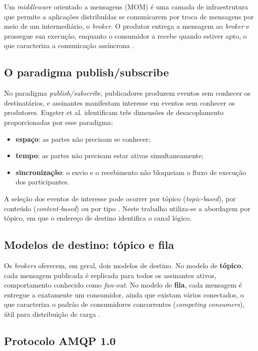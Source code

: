 \documentclass[12pt,a4paper]{article}
\begin{document}
Um \textit{middleware} orientado a mensagens (MOM) é uma camada de infraestrutura que permite a aplicações distribuídas se comunicarem por troca de mensagens por meio de um intermediário, o \textit{broker}. O produtor entrega a mensagem ao \textit{broker} e prossegue sua execução, enquanto o consumidor a recebe quando estiver apto, o que caracteriza a comunicação assíncrona \cite{snyder2011}.

\subsection{O paradigma publish/subscribe}

No paradigma \textit{publish/subscribe}, publicadores produzem eventos sem conhecer os destinatários, e assinantes manifestam interesse em eventos sem conhecer os produtores. Eugster et al. \cite{eugster2003} identificam três dimensões de desacoplamento proporcionadas por esse paradigma:

\begin{itemize}[nosep]
\item \textbf{espaço}: as partes não precisam se conhecer;
\item \textbf{tempo}: as partes não precisam estar ativas simultaneamente;
\item \textbf{sincronização}: o envio e o recebimento não bloqueiam o fluxo de execução dos participantes.
\end{itemize}

A seleção dos eventos de interesse pode ocorrer por tópico (\textit{topic-based}), por conteúdo (\textit{content-based}) ou por tipo \cite{eugster2003}. Neste trabalho utiliza-se a abordagem por tópico, em que o endereço de destino identifica o canal lógico.

\subsection{Modelos de destino: tópico e fila}

Os \textit{brokers} oferecem, em geral, dois modelos de destino. No modelo de \textbf{tópico}, cada mensagem publicada é replicada para todos os assinantes ativos, comportamento conhecido como \textit{fan-out}. No modelo de \textbf{fila}, cada mensagem é entregue a exatamente um consumidor, ainda que existam vários conectados, o que caracteriza o padrão de consumidores concorrentes (\textit{competing consumers}), útil para distribuição de carga \cite{snyder2011}.

\subsection{Protocolo AMQP 1.0}
\end{document}
